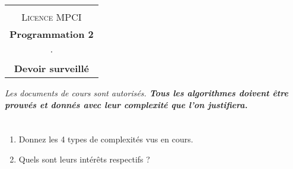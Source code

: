 \documentclass
[12pt]
{article}
\begin{document}
\begin{center}
  \begin{tabular}{c}
  \hline\\%
  {\textsc{Licence MPCI}}\vspace{0.1cm}
  \\
      {\bf {Programmation 2}}\\\vspace{0.2cm}
    ·  \\
    {\bf  {\large Devoir surveillé}}\vspace{0.1cm}\\ 
    \hline
  \end{tabular}
\end{center}
\vspace{0.6cm}
%
%
{\it Les documents de cours sont autorisés. 
\textbf {Tous les algorithmes doivent être prouvés et donnés avec leur complexité que l'on justifiera.}}
\vspace{0.1cm}

\section{}

\begin{enumerate}
    \item Donnez les 4 types de complexités vus en cours.
    \item Quels sont leurs intérêts respectifs ?
\end{enumerate}


\section{}
\end{document}

